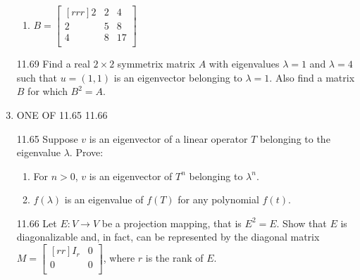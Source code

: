 \documentclass[12pt]{article}
\theoremstyle{definition}
\theoremstyle{plain}
\begin{document}
\begin{enumerate}
\begin{enumerate}
	\item $B=\begin{bmatrix}[rrr]2&2&4\\2&5&8\\4&8&17\\\end{bmatrix}$
	\end{enumerate}
\item[11.69]Find a real $2 \times 2$ symmetrix matrix $A$ with eigenvalues $\lambda = 1$ and $\lambda = 4$ such that $u=(1,1)$ is an eigenvector belonging to $\lambda=1$. Also find a matrix $B$ for which $B^2=A$.
\item ONE OF 11.65 11.66
\item[11.65]Suppose $v$ is an eigenvector of a linear operator $T$ belonging to the eigenvalue $\lambda$. Prove:
	\begin{enumerate}
	\item For $n>0$, $v$ is an eigenvector of $T^n$ belonging to $\lambda^n$.
	\item $f(\lambda)$ is an eigenvalue of $f(T)$ for any polynomial $f(t)$.
	\end{enumerate}
\item[11.66]Let $E:V\rightarrow V$ be a projection mapping, that is $E^2=E$. Show that $E$ is diagonalizable and, in fact, can be represented by the diagonal matrix $M=\begin{bmatrix}[rr]I_r&0\\0&0\\\end{bmatrix}$, where $r$ is the rank of $E$.
	
\end{enumerate}	
\end{document}
